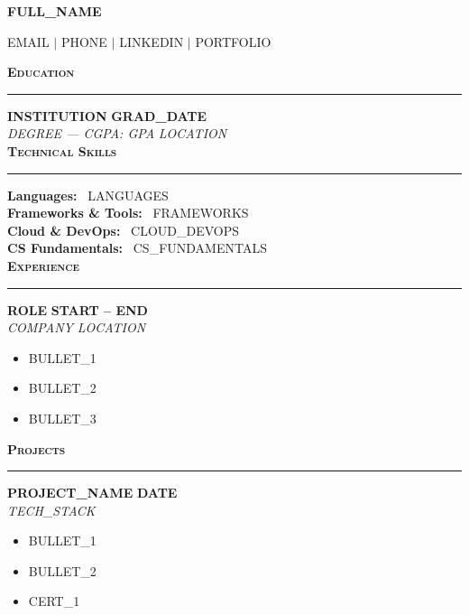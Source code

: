 \documentclass[11pt,letterpaper]{article}
\newcommand{\rname}[1]{{\centering\Huge\bfseries #1\par}}
\newcommand{\rcontact}[1]{{\centering\small #1\par}}
\newcommand{\ressection}[1]{%
  \vspace{9pt}
  {\bfseries\normalsize\textsc{#1}}\\[-6pt]
  \noindent\rule{\linewidth}{0.5pt}\vspace{3pt}
}
\newcommand{\resheading}[4]{%
  \noindent\textbf{#1} \hfill \textbf{#2}\\[1pt]
  \noindent\textit{#3} \hfill \textit{#4}\\[2pt]
}
\newenvironment{resitems}{%
  \begin{itemize}[leftmargin=16pt,itemsep=1pt,topsep=2pt,parsep=0pt,label=\textbullet]
}{%
  \end{itemize}
}
\newcommand{\resitem}[1]{\item #1}
\newcommand{\skillrow}[2]{\textbf{#1:}~#2\\[2pt]}
\begin{document}
\rname{ {{FULL_NAME}} }
\rcontact{ {{EMAIL}} $\vert$ {{PHONE}} $\vert$ {{LINKEDIN}} $\vert$ {{PORTFOLIO}} }

\ressection{Education}
\resheading{ {{INSTITUTION}} }{ {{GRAD_DATE}} }{ {{DEGREE}} --- CGPA: {{GPA}} }{ {{LOCATION}} }

\ressection{Technical Skills}
\skillrow{Languages}{ {{LANGUAGES}} }
\skillrow{Frameworks \& Tools}{ {{FRAMEWORKS}} }
\skillrow{Cloud \& DevOps}{ {{CLOUD_DEVOPS}} }
\skillrow{CS Fundamentals}{ {{CS_FUNDAMENTALS}} }

\ressection{Experience}
\resheading{ {{ROLE}} }{ {{START}} -- {{END}} }{ {{COMPANY}} }{ {{LOCATION}} }
\begin{resitems}
\resitem{ {{BULLET_1}} }
\resitem{ {{BULLET_2}} }
\resitem{ {{BULLET_3}} }
\end{resitems}

\ressection{Projects}
\resheading{ {{PROJECT_NAME}} }{ {{DATE}} }{ {{TECH_STACK}} }{ }
\begin{resitems}
\resitem{ {{BULLET_1}} }
\resitem{ {{BULLET_2}} }
\end{resitems}

\begin{resitems}
\resitem{ {{CERT_1}} }
\end{resitems}
\end{document}
